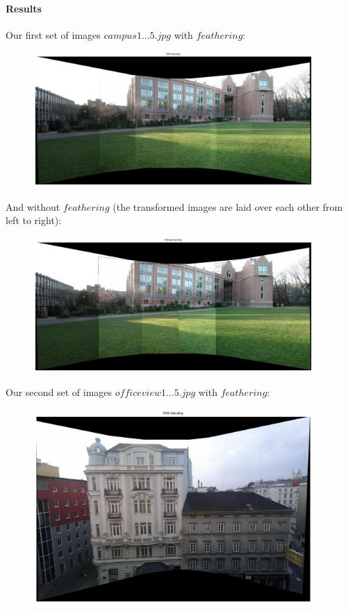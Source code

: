 \documentclass[subfigure,epsfig,fleqn,float,numbers=noenddot]{scrartcl}
\begin{document}
\paragraph{Results}
Our first set of images $campus1...5.jpg$ with $feathering$:
\begin{figure}[H]
		\centering
		\includegraphics[width=0.95\textwidth]{./img/withBlending.jpg}
		\caption{}
		\label{img:withBlend}
\end{figure}
And without $feathering$ (the transformed images are laid over each other from left to right):
\begin{figure}[H]
		\centering
		\includegraphics[width=0.95\textwidth]{./img/withoutBlending.jpg}
		\caption{}
		\label{img:withoutBlend}
\end{figure} 
Our second set of images $officeview1...5.jpg$ with $feathering$:
\begin{figure}[H]
		\centering
		\includegraphics[width=0.95\textwidth]{./img/withBlending2.jpg}
		\caption{}
		\label{img:withBlend2}
\end{figure}
\end{document}
